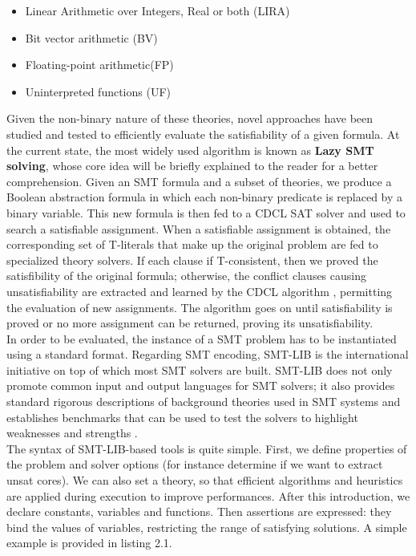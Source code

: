 \begin{itemize}
    \item Linear Arithmetic over Integers, Real or both (LIRA)
    \item Bit vector arithmetic (BV)
    \item Floating-point arithmetic(FP)
    \item Uninterpreted functions (UF)
\end{itemize}

Given the non-binary nature of these theories, novel approaches have been studied and tested to efficiently evaluate the satisfiability of a given formula. At the current state, the most widely used algorithm is known as \textbf{Lazy SMT solving}\cite{lazysmt}, whose core idea will be briefly explained to the reader for a better comprehension. Given an SMT formula and a subset of theories, we produce a Boolean abstraction formula in which each non-binary predicate is replaced by a binary variable. This new formula is then fed to a CDCL SAT solver and used to search a satisfiable assignment. When a satisfiable assignment is obtained, the corresponding set of T-literals that make up the original problem are fed to specialized theory solvers. If each clause if T-consistent, then we proved the satisfibility of the original formula; otherwise, the conflict clauses causing unsatisfiability are extracted and learned by the CDCL algorithm , permitting the evaluation of new assignments. The algorithm goes on until satisfiability is proved or no more assignment can be returned, proving its unsatisfiability. \\
In order to be evaluated, the instance of a SMT problem has to be instantiated using a standard format. Regarding SMT encoding, SMT-LIB is the international initiative on top of which most SMT solvers are built. SMT-LIB does not only promote common input and output languages for SMT solvers; it also provides standard rigorous descriptions of background theories used in SMT systems and establishes benchmarks that can be used to test the solvers to highlight weaknesses and strengths \cite{smtlib}. \\
The syntax of SMT-LIB-based tools is quite simple. First, we define properties of the problem and solver options (for instance determine if we want to extract unsat cores). We can also set a theory, so that efficient algorithms and heuristics are applied during execution to improve performances. After this introduction, we declare constants, variables and functions. Then assertions are expressed: they bind the values of variables, restricting the range of satisfying solutions. A simple example is provided in listing 2.1. \\
